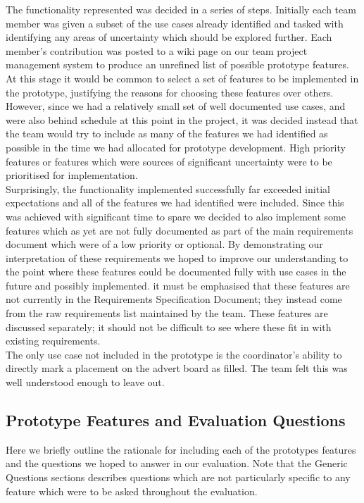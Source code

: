 \documentclass{l3deliverable}
\begin{document}
The functionality represented was decided in a series of steps. Initially each team member was given a subset of the use cases
already identified and tasked with identifying any areas of uncertainty which should be explored further. Each member's contribution was posted to a wiki page on our team 
project management system to produce an unrefined list of possible prototype features.\\

At this stage it would be common to select a set of features to be implemented in the prototype, justifying the reasons for choosing these features over others. However, since
we had a relatively small set of well documented use cases, and were also behind schedule at this point in the project, it was decided instead that the team would try
to include as many of the features we had identified as possible in the time we had allocated for prototype development. High priority features or features which were sources of
significant uncertainty were to be prioritised for implementation.\\

Surprisingly, the functionality implemented successfully far exceeded initial expectations and all of the features we had identified were included. Since this was achieved with significant time to spare
we decided to also implement some features which as yet are not fully documented as part of the main requirements document which were of a low priority or optional. By demonstrating our interpretation of these requirements
we hoped to improve our understanding to the point where these features could be documented fully with use cases in the future and possibly implemented. it must be emphasised that these features are not
currently in the Requirements Specification Document; they instead come from the raw requirements list maintained by the team. These features are discussed separately; it should
not be difficult to see where these fit in with existing requirements.\\

The only use case not included in the prototype is the coordinator's ability to directly mark a placement on the advert board as filled. The team felt this was well understood enough to leave out.

\subsection{Prototype Features and Evaluation Questions}
Here we briefly outline the rationale for including each of the prototypes features and the questions we
hoped to answer in our evaluation. Note that the Generic Questions sections describes questions which are not particularly specific to any feature
which were to be asked throughout the evaluation.
\end{document}
